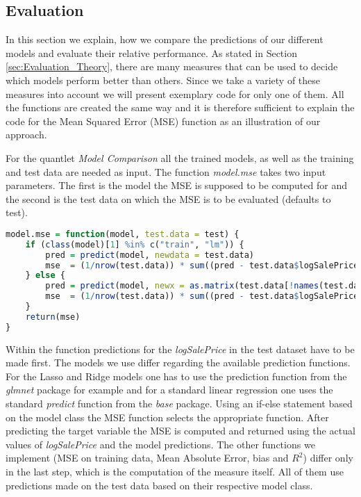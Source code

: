 \subsection{Evaluation}\label{sec:Evaluation_Implementation}
In this section we explain, how we compare the predictions of our different models and evaluate their relative performance. As stated in Section \ref{sec:Evaluation_Theory}, there are many measures that can be used to decide which models perform better than others. Since we take a variety of these measures into account we will present exemplary code for only one of them. All the functions are created the same way and it is therefore sufficient to explain the code for the Mean Squared Error (MSE) function as an illustration of our approach.

For the quantlet \textit{Model Comparison} all the trained models, as well as the training and test data are needed as input. The function \textit{model.mse} takes two input parameters. The first is the model the MSE is supposed to be computed for and the second is the test data on which the MSE is to be evaluated (defaults to test). 
\begin{lstlisting}[language=R]
model.mse = function(model, test.data = test) {
    if (class(model)[1] %in% c("train", "lm")) {
        pred = predict(model, newdata = test.data)
        mse  = (1/nrow(test.data)) * sum((pred - test.data$logSalePrice)^2)
    } else {
        pred = predict(model, newx = as.matrix(test.data[!names(test.data) %in% "logSalePrice"]), s = "lambda.1se")
        mse  = (1/nrow(test.data)) * sum((pred - test.data$logSalePrice)^2)
    }
    return(mse)
}
\end{lstlisting}
Within the function predictions for the \textit{logSalePrice} in the test dataset have to be made first. The models we use differ regarding the available prediction functions. For the Lasso and Ridge models one has to use the prediction function from the \textit{glmnet} package for example and for a standard linear regression one uses the standard \textit{predict} function from the \textit{base} package. Using an if-else statement based on the model class the MSE function selects the appropriate function. After predicting the target variable the MSE is computed and returned using the actual values of \textit{logSalePrice} and the model predictions. The other functions we implement (MSE on training data, Mean Absolute Error, bias and $R^2$) differ only in the last step, which is the computation of the measure itself. All of them use predictions made on the test data based on their respective model class. 

